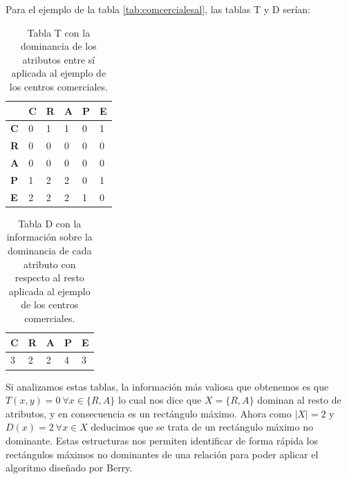 \documentclass[oneside,openright,titlepage,numbers=noenddot,openany,headinclude,footinclude=true,
cleardoublepage=empty,abstractoff,BCOR=5mm,paper=a4,fontsize=12pt,main=spanish]{scrreprt}
\begin{document}
Para el ejemplo de la tabla \ref{tab:comcercialesal}, las tablas T y D serían:

\begin{minipage}{.5\textwidth}
\centering
    \begin{table}[H]
    \begin{tabular}{|l|l|l|l|l|l|}
    \hline
               & \textbf{C} & \textbf{R} & \textbf{A} & \textbf{P} & \textbf{E} \\ \hline
    \textbf{C} & 0          & 1          & 1          & 0          & 1          \\ \hline
    \textbf{R} & 0          & 0          & 0          & 0          & 0          \\ \hline
    \textbf{A} & 0          & 0          & 0          & 0          & 0          \\ \hline
    \textbf{P} & 1          & 2          & 2          & 0          & 1          \\ \hline
    \textbf{E} & 2          & 2          & 2          & 1          & 0          \\ \hline
    \end{tabular}
    \caption{Tabla T con la dominancia de los atributos entre sí aplicada al ejemplo de los centros comerciales.}
    \label{tab:T}
    \end{table}
\end{minipage}%
\begin{minipage}{.5\textwidth}
  \centering
  \begin{table}[H]
    \begin{tabular}{|l|l|l|l|l|}
    \hline
    \textbf{C} & \textbf{R} & \textbf{A} & \textbf{P} & \textbf{E} \\ \hline
    3          & 2          & 2          & 4          & 3          \\ \hline
    \end{tabular}
    \caption{Tabla D con la información sobre la dominancia de cada atributo con respecto al resto aplicada al ejemplo de los centros comerciales.}
    \label{tab:my-table}
    \end{table}
\end{minipage}

Si analizamos estas tablas, la información más valiosa que obtenemos es que $T(x,y)=0 \ \forall x\in \{R,A\}$ lo cual nos dice que $X=\{R,A\}$ dominan al resto de atributos, y en consecuencia es un rectángulo máximo. Ahora como $|X|=2$ y $D(x)=2 \ \forall x \in X$ deducimos que se trata de un rectángulo máximo no dominante. Estas estructuras nos permiten identificar de forma rápida los rectángulos máximos no dominantes de una relación para poder aplicar el algoritmo diseñado por Berry.
\end{document}
